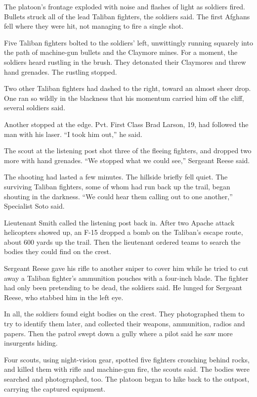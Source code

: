 \documentclass[12pt,a4paper,onecolumn]{article}
\begin{document}
The platoon's frontage exploded with noise and flashes of light as soldiers fired. Bullets struck
all of the lead Taliban fighters, the soldiers said. The first Afghans fell where they were hit, not
managing to fire a single shot.

Five Taliban fighters bolted to the soldiers' left, unwittingly running squarely into the path of
machine-gun bullets and the Claymore mines. For a moment, the soldiers heard rustling in the brush.
They detonated their Claymores and threw hand grenades. The rustling stopped.

Two other Taliban fighters had dashed to the right, toward an almost sheer drop. One ran so wildly
in the blackness that his momentum carried him off the cliff, several soldiers said.

Another stopped at the edge. Pvt. First Class Brad Larson, 19, had followed the man with his laser.
``I took him out,'' he said.

The scout at the listening post shot three of the fleeing fighters, and dropped two more with hand
grenades. ``We stopped what we could see,'' Sergeant Reese said.

The shooting had lasted a few minutes. The hillside briefly fell quiet. The surviving Taliban
fighters, some of whom had run back up the trail, began shouting in the darkness. ``We could hear
them calling out to one another,'' Specialist Soto said.

Lieutenant Smith called the listening post back in. After two Apache attack helicopters showed up,
an F-15 dropped a bomb on the Taliban's escape route, about 600 yards up the trail. Then the
lieutenant ordered teams to search the bodies they could find on the crest.

Sergeant Reese gave his rifle to another sniper to cover him while he tried to cut away a Taliban
fighter's ammunition pouches with a four-inch blade. The fighter had only been pretending to be
dead, the soldiers said. He lunged for Sergeant Reese, who stabbed him in the left eye.

In all, the soldiers found eight bodies on the crest. They photographed them to try to identify them
later, and collected their weapons, ammunition, radios and papers. Then the patrol swept down a
gully where a pilot said he saw more insurgents hiding.

Four scouts, using night-vision gear, spotted five fighters crouching behind rocks, and killed them
with rifle and machine-gun fire, the scouts said. The bodies were searched and photographed, too.
The platoon began to hike back to the outpost, carrying the captured equipment.
\end{document}
